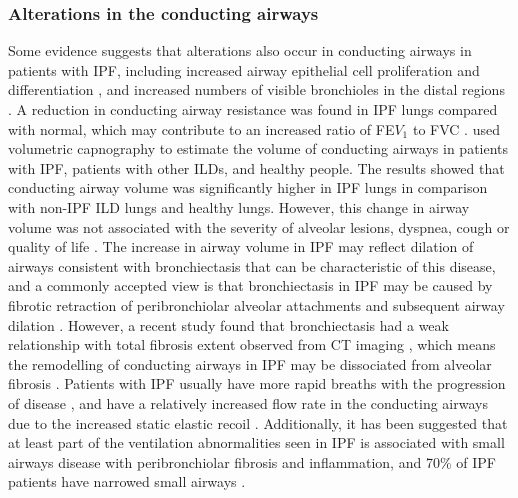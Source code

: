 \subsubsection{Alterations in the conducting airways}
Some evidence suggests that alterations also occur in conducting airways in patients with IPF, including increased airway epithelial cell proliferation \citep{vuorinen2008peroxiredoxin} and differentiation \citep{plantier2016increased}, and increased numbers of visible bronchioles in the distal regions \citep{chilosi2002abnormal}. A reduction in conducting airway resistance was found in IPF lungs compared with normal, which may contribute to an increased ratio of FE$V_1$ to FVC \citep{pastre2015different}. \cite{plantier2016increased} used volumetric capnography to estimate the volume of conducting airways in patients with IPF, patients with other ILDs, and healthy people. The results showed that conducting airway volume was significantly higher in IPF lungs in comparison with non-IPF ILD lungs and healthy lungs. However, this change in airway volume was not associated with the severity of alveolar lesions, dyspnea, cough or quality of life \citep{plantier2016increased}. The increase in airway volume in IPF may reflect dilation of airways consistent with bronchiectasis that can be characteristic of this disease, and a commonly accepted view is that bronchiectasis in IPF may be caused by fibrotic retraction of peribronchiolar alveolar attachments and subsequent airway dilation \citep{sumikawa2008computed}. However, a recent study found that bronchiectasis had a weak relationship with total fibrosis extent observed from CT imaging \citep{walsh2015relationship}, which means the remodelling of conducting airways in IPF may be dissociated from alveolar fibrosis \citep{plantier2016increased}. Patients with IPF usually have more rapid breaths with the progression of disease \citep{kornbluth1980respiratory, renzi1982pattern}, and have a relatively increased flow rate in the conducting airways due to the increased static elastic recoil \citep{american2000idiopathic}. Additionally, it has been suggested that at least part of the ventilation abnormalities seen in IPF is associated with small airways disease with peribronchiolar fibrosis and inflammation, and 70\% of IPF patients have narrowed small airways \citep{crystal1976idiopathic}.

